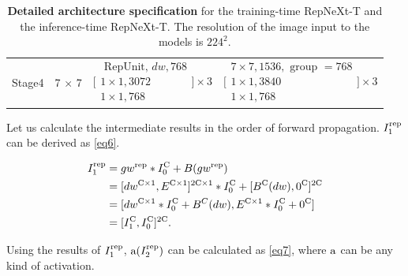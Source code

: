 \documentclass[preprint,12pt]{elsarticle}
\begin{document}
\begin{table}[t]
\begin{adjustbox}{center}
\begin{tabular}{cc|c|c}
\multicolumn{1}{c|}{Stage4} & 7 $\times$ 7 & $\bigg [\begin{array}{c}\text { RepUnit, } d w, 768 \\ 1 \times 1,3072 \\ 1 \times 1,768\end{array}\bigg ] \times 3$ & $\bigg [\begin{array}{c}7 \times 7,1536, \text { group }=768 \\ 1 \times 1,3840 \\ 1 \times 1,768\end{array}\bigg ] \times 3$ \\ %
\end{tabular}
\end{adjustbox}
\caption{\textbf{Detailed architecture specification} for the training-time RepNeXt-T and the inference-time RepNeXt-T. The resolution of the image input to the models is $224^2$.}
\label{table:architecture}
\end{table}

Let us calculate the intermediate results in the order of forward propagation. $I_1^{\rm rep}$ can be derived as \eqref{eq6}.

\begin{equation}
    \begin{aligned}
    I_1^{\rm rep} &= gw^{\rm rep} * I_0^{\rm C} + B(gw^{\rm rep})\\&= [dw^{{\rm C} \times 1}, E^{{\rm C} \times 1}]^{2{\rm C} \times 1} * I_0^{\rm C} + [B^{{\rm C}}(dw), 0^{{\rm C}}]^{2{\rm C}} \\&= [dw^{{\rm C} \times 1} * I_0^{\rm C}+B^C(dw), E^{{\rm C} \times 1} * I_0^{\rm C}+0^{\rm C}] \\&= [I_1^{\rm C}, I_0^{\rm C}]^{2{\rm C}}.
    \end{aligned}
    \label{eq6}
\end{equation}

Using the results of $I_1^{\rm rep}$, ${\rm a}(I_2^{\rm rep})$ can be calculated as \eqref{eq7}, where ${\rm a}$ can be any kind of activation.
\end{document}

